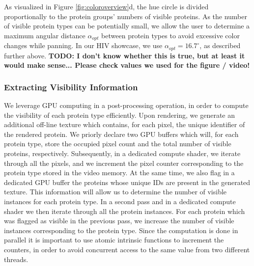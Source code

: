 \documentclass{egpubl}
\begin{document}
	As visualized in Figure \ref{fig:coloroverview}d, the hue circle is divided proportionally to the protein groups' numbers of visible proteins. 
	As the number of visible protein types can be potentially small, we allow the user to determine a maximum angular distance $\alpha_{opt}$ between protein types to avoid excessive color changes while panning. 
	In our HIV showcase, we use $\alpha_{opt}=16.7^{\circ}$, as described further above. \textbf{TODO: I don't know whether this is true, but at least it would make sense... Please check values we used for the figure / video!} 
	
	
	\subsubsection{Extracting Visibility Information}
	\label{sssec:extracting}
	We leverage GPU computing in a post-processing operation, in order to compute the visibility of each protein type efficiently.
	Upon rendering, we generate an additional off-line texture which contains, for each pixel, the unique identifier of the rendered protein.
	We priorly declare two GPU buffers which will, for each protein type, store the occupied pixel count and the total number of visible proteins, respectively.
	Subsequently, in a dedicated compute shader, we iterate through all the pixels, and we increment the pixel counter corresponding to the protein type stored in the video memory.
	At the same time, we also flag in a dedicated GPU buffer the proteins whose unique IDs are present in the generated texture.
	This information will allow us to determine the number of visible instances for each protein type.
	In a second pass and in a dedicated compute shader we then iterate through all the protein instances.
	For each protein which was flagged as visible in the previous pass, we increase the number of visible instances corresponding to the protein type.
	Since the computation is done in parallel it is important to use atomic intrinsic functions to increment the counters, in order to avoid concurrent access to the same value from two different threads.
	
\end{document}
